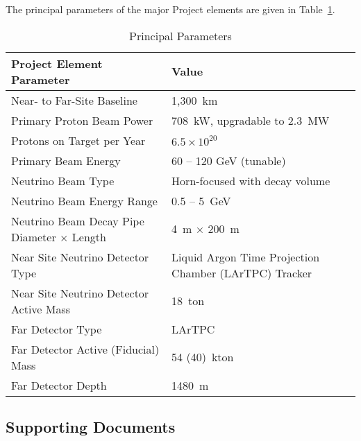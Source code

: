 The principal parameters of the major Project elements are given in Table~\ref{table:param-summ-fd}. 

\begin{table}[htpb]
\caption{\expshort Principal Parameters}
\label{table:param-summ-fd}
\centering
 \begin{tabular}[htbp]{|l|| p{6cm} |}
\hline
Project Element Parameter & Value  \\
\hline\hline
Near- to Far-Site Baseline &  1,300~km\\
\hline
Primary Proton Beam Power &  708~kW, upgradable to 2.3~MW\\
\hline
Protons on Target per Year &   $6.5 \times 10^{20}$  \\
\hline
Primary Beam Energy &  60 -- 120 GeV (tunable) \\
\hline
Neutrino Beam Type &  Horn-focused with decay volume\\
\hline
Neutrino Beam Energy Range &  0.5 -- 5~GeV \\ 
\hline
Neutrino Beam Decay Pipe Diameter $\times$ Length &  4~m $\times$ 200~m \\
\hline
Near Site Neutrino Detector Type & Liquid Argon Time Projection Chamber (LArTPC) Tracker \\
\hline
Near Site Neutrino Detector Active Mass &  18~ton \\
\hline
Far Detector Type &  LArTPC \\
\hline
Far Detector Active (Fiducial) Mass &  54 (40)~kton\\
\hline
Far Detector Depth &  1480~m \\
\hline
\end{tabular} 
\end{table}

\subsection{Supporting Documents}
\label{intro-supp-doc}

